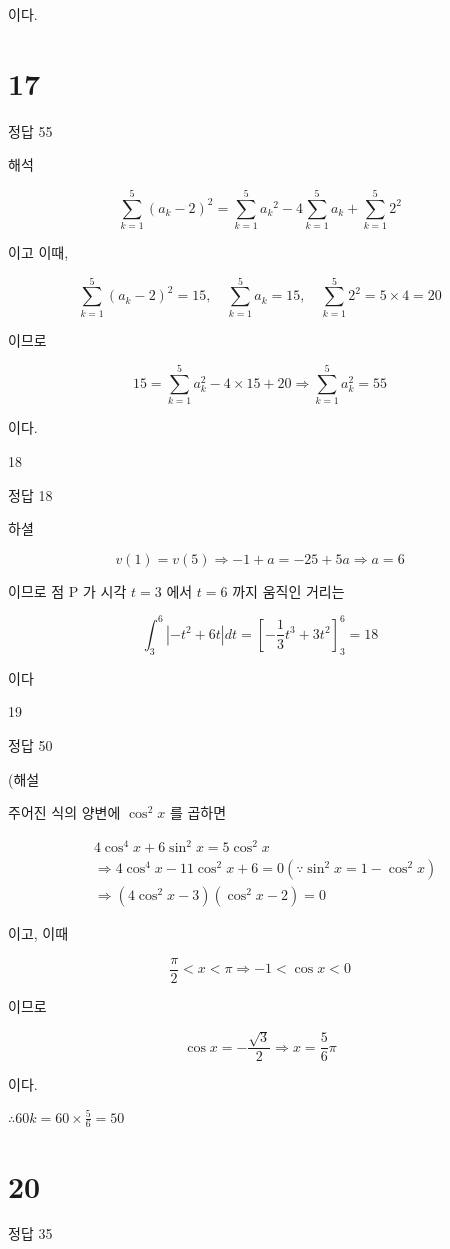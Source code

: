 \documentclass[10pt]{article}
\begin{document}
이다.

\section*{17}
정답 55

해석

\[
\sum_{k=1}^{5}\left(a_{k}-2\right)^{2}=\sum_{k=1}^{5} a_{k}{ }^{2}-4 \sum_{k=1}^{5} a_{k}+\sum_{k=1}^{5} 2^{2}
\]

이고 이때,

\[
\sum_{k=1}^{5}\left(a_{k}-2\right)^{2}=15, \quad \sum_{k=1}^{5} a_{k}=15, \quad \sum_{k=1}^{5} 2^{2}=5 \times 4=20
\]

이므로

\[
15=\sum_{k=1}^{5} a_{k}^{2}-4 \times 15+20 \Rightarrow \sum_{k=1}^{5} a_{k}^{2}=55
\]

이다.

18

정답 18

하셜

\[
v(1)=v(5) \Rightarrow-1+a=-25+5 a \Rightarrow a=6
\]

이므로 점 P 가 시각 \(t=3\) 에서 \(t=6\) 까지 움직인 거리는

\[
\int_{3}^{6}\left|-t^{2}+6 t\right| d t=\left[-\frac{1}{3} t^{3}+3 t^{2}\right]_{3}^{6}=18
\]

이다

19

정답 50

(해설

주어진 식의 양변에 \(\cos ^{2} x\) 를 곱하면

\[
\begin{aligned}
& 4 \cos ^{4} x+6 \sin ^{2} x=5 \cos ^{2} x \\
& \Rightarrow 4 \cos ^{4} x-11 \cos ^{2} x+6=0\left(\because \sin ^{2} x=1-\cos ^{2} x\right) \\
& \Rightarrow\left(4 \cos ^{2} x-3\right)\left(\cos ^{2} x-2\right)=0
\end{aligned}
\]

이고, 이때

\[
\frac{\pi}{2}<x<\pi \Rightarrow-1<\cos x<0
\]

이므로

\[
\cos x=-\frac{\sqrt{3}}{2} \Rightarrow x=\frac{5}{6} \pi
\]

이다.

\(\therefore 60 k=60 \times \frac{5}{6}=50\)

\section*{20}
정답 35
\end{document}
